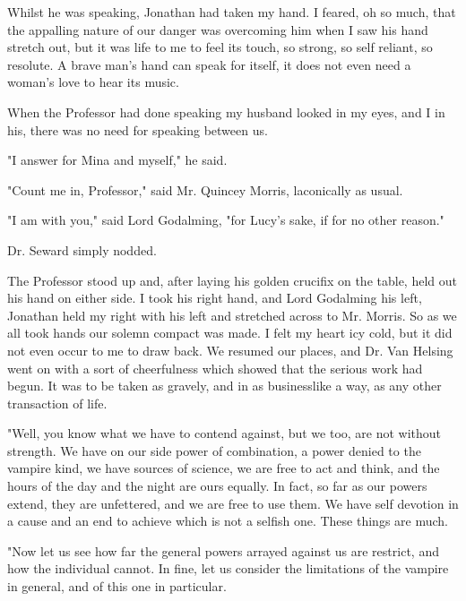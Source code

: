 Whilst he was speaking, Jonathan had taken my hand. I feared, oh so much, that the appalling nature of our danger was overcoming him when I saw his hand stretch out, but it was life to me to feel its touch, so strong, so self reliant, so resolute. A brave man's hand can speak for itself, it does not even need a woman's love to hear its music. 

When the Professor had done speaking my husband looked in my eyes, and I in his, there was no need for speaking between us. 

"I answer for Mina and myself," he said. 

"Count me in, Professor," said Mr. Quincey Morris, laconically as usual. 

"I am with you," said Lord Godalming, "for Lucy's sake, if for no other reason." 

Dr. Seward simply nodded. 

The Professor stood up and, after laying his golden crucifix on the table, held out his hand on either side. I took his right hand, and Lord Godalming his left, Jonathan held my right with his left and stretched across to Mr. Morris. So as we all took hands our solemn compact was made. I felt my heart icy cold, but it did not even occur to me to draw back. We resumed our places, and Dr. Van Helsing went on with a sort of cheerfulness which showed that the serious work had begun. It was to be taken as gravely, and in as businesslike a way, as any other transaction of life. 

"Well, you know what we have to contend against, but we too, are not without strength. We have on our side power of combination, a power denied to the vampire kind, we have sources of science, we are free to act and think, and the hours of the day and the night are ours equally. In fact, so far as our powers extend, they are unfettered, and we are free to use them. We have self devotion in a cause and an end to achieve which is not a selfish one. These things are much. 

"Now let us see how far the general powers arrayed against us are restrict, and how the individual cannot. In fine, let us consider the limitations of the vampire in general, and of this one in particular. 

